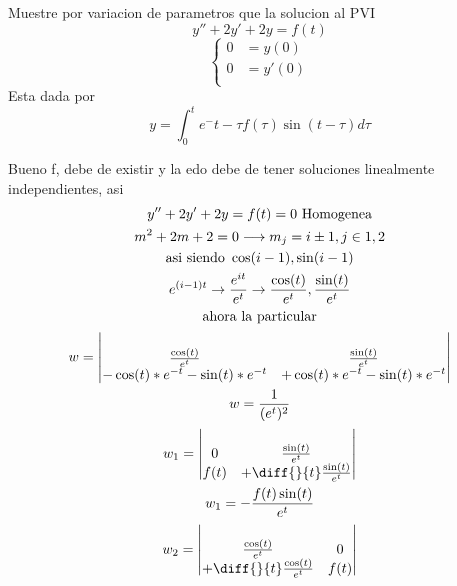 \begin{prob}
Muestre por variacion de parametros que la solucion al PVI $$y'' +2y'+2y = f(t)$$
\begin{equation}
    \begin{cases}
        0 & =y(0)\\
        0 & =y'(0)\\
    \end{cases}
\end{equation}
    Esta dada por 
    $$y = \int_0^t e^-{t-\tau}f(\tau)\sin(t-\tau)d\tau$$
\end{prob}
\begin{mdframed}
    Bueno f, debe de existir y la edo debe de tener soluciones linealmente independientes, asi 
    \begin{gather*}
        y'' +2y'+2y = f(t) =0 \text{  Homogenea}\\
        m^2+2m+2 =0 \longrightarrow m_j = i\pm 1, j \in {1,2}\\
        \text{asi siendo } \cos(i-1), \sin(i-1)\\
        e^{(i-1)t} \rightarrow \frac{e^{it}}{e^t} \rightarrow \frac{\cos(t)}{e^t},  \frac{\sin(t)}{e^t}\\
        \text{ahora la particular}\\
        w=\begin{vmatrix}\\
        \frac{\cos(t)}{e^t} & \frac{\sin(t)}{e^t}  \\ 
        -\cos(t)*e^{-t} -\sin(t)*e^{-t} & +\cos(t)*e^{-t}  -\sin(t)*e^{-t}  \\
        \end{vmatrix}\\
        w = \frac{1}{(e^t)^2}\\
        w_1=\begin{vmatrix}\\
        0 & \frac{\sin(t)}{e^t}  \\ 
        f(t) & +\diff{}{t}\frac{\sin(t)}{e^t}  \\
        \end{vmatrix}\\
        w_1 = -\frac{f(t)\sin(t)}{e^t}\\
        w_2=\begin{vmatrix}\\
        \frac{\cos(t)}{e^t} & 0  \\ 
        +\diff{}{t}\frac{\cos(t)}{e^t} &f(t)   \\
        \end{vmatrix}\\

\end{gather*}
\end{mdframed}
